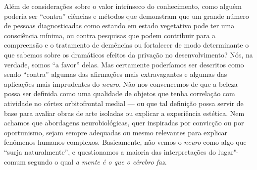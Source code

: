 Além de considerações sobre o valor intrínseco do conhecimento, como
alguém poderia ser ``contra'' ciências e métodos que demonstram que um
grande número de pessoas diagnosticadas como estando em estado
vegetativo pode ter uma consciência mínima, ou contra pesquisas que
podem contribuir para a compreensão e o tratamento de demências ou
fortalecer de modo determinante o que sabemos sobre os dramáticos
efeitos da privação no desenvolvimento? Nós, na verdade, somos ``a
favor'' delas. Mas certamente poderíamos ser descritos como sendo
``contra'' algumas das afirmações mais extravagantes e algumas das
aplicações mais imprudentes do \emph{neuro}. Não nos convencemos de que
a beleza possa ser definida como uma qualidade de objetos que tenha
correlação com atividade no córtex orbitofrontal medial --- ou que tal
definição possa servir de base para avaliar obras de arte isoladas ou
explicar a experiência estética. Nem achamos que abordagens
neurobiológicas, quer inspiradas por convicção ou por oportunismo, sejam
sempre adequadas ou mesmo relevantes para explicar fenômenos humanos
complexos. Basicamente, não vemos o \emph{neuro} como algo que ``surja
naturalmente'', e questionamos a maioria das interpretações do
lugar"-comum segundo o qual \emph{a mente é o que o cérebro faz}.

